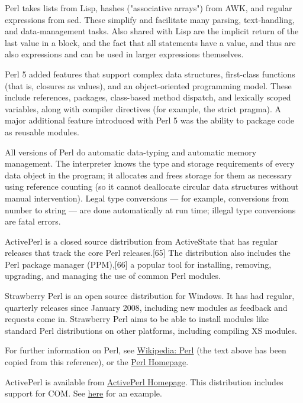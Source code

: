 \vpara
Perl takes lists from Lisp, hashes ("associative arrays") from AWK, and regular expressions from sed. These simplify and facilitate many parsing, text-handling, and data-management tasks. Also shared with Lisp are the implicit return of the last value in a block, and the fact that all statements have a value, and thus are also expressions and can be used in larger expressions themselves.

\vpara
Perl 5 added features that support complex data structures, first-class functions (that is, closures as values), and an object-oriented programming model. These include references, packages, class-based method dispatch, and lexically scoped variables, along with compiler directives (for example, the strict pragma). A major additional feature introduced with Perl 5 was the ability to package code as reusable modules. 

\vpara
All versions of Perl do automatic data-typing and automatic memory management. The interpreter knows the type and storage requirements of every data object in the program; it allocates and frees storage for them as necessary using reference counting (so it cannot deallocate circular data structures without manual intervention). Legal type conversions — for example, conversions from number to string — are done automatically at run time; illegal type conversions are fatal errors.

\vpara
ActivePerl is a closed source distribution from ActiveState that has regular releases that track the core Perl releases.[65] The distribution also includes the Perl package manager (PPM),[66] a popular tool for installing, removing, upgrading, and managing the use of common Perl modules.

\vpara
Strawberry Perl is an open source distribution for Windows. It has had regular, quarterly releases since January 2008, including new modules as feedback and requests come in. Strawberry Perl aims to be able to install modules like standard Perl distributions on other platforms, including compiling XS modules.

\vpara
For further information on Perl, see \href{http://en.wikipedia.org/wiki/Perl}{Wikipedia: Perl} (the text above has been copied from this reference), or the  \href{http://www.perl.org/}{Perl Homepage}.

\vpara
ActivePerl is available from  \href{http://www.activestate.com/activeperl/downloads}{ActivePerl Homepage}. This distribution includes support for COM. See \href{http://support.microsoft.com/kb/214797/en-us}{here} for an example.


